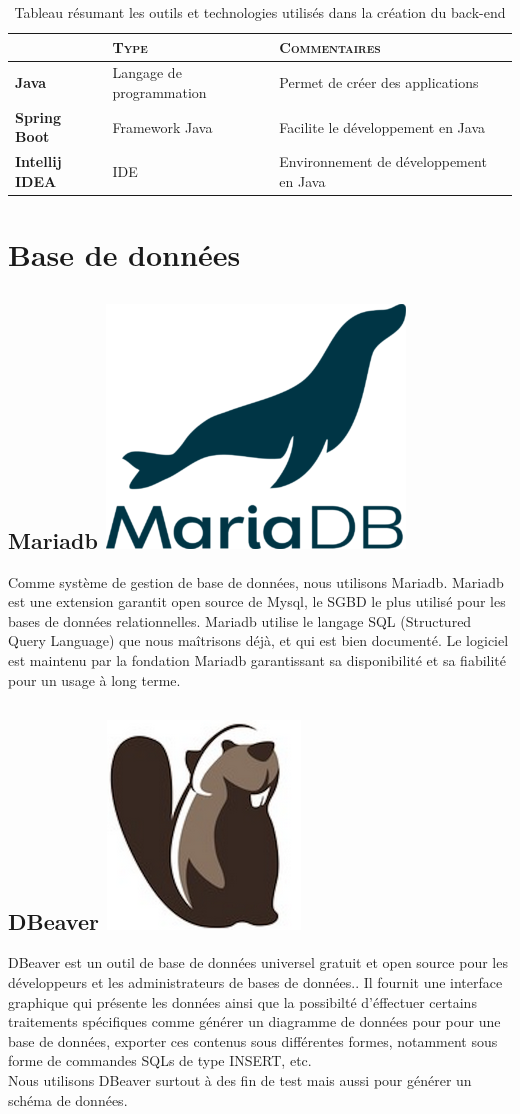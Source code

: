 \vspace{1cm}

\begin{table}[!ht]
	\centering
	\begin{tabular}[pos]{ | b | m{} | m{} |}
		\rowcolor{lightgray}
		
		& \textbf{\textsc{\large{Type}}} & \textbf{\textsc{\large{Commentaires}}}\\
		\hline
		\textbf{Java} & Langage de programmation & Permet de cr\'eer des applications\\
		\textbf{Spring Boot} & Framework Java & Facilite le d\'eveloppement en Java\\
		\textbf{Intellij IDEA} & IDE & Environnement de d\'eveloppement en Java\\
		\hline
	\end{tabular}
	\caption{Tableau r\'esumant les outils et technologies utilis\'es dans la cr\'eation du back-end}
	\label{TabOutilBackEnd}
\end{table}

			

			
	\section{Base de donn\'ees}
			
		\subsection{Mariadb \includegraphics[height=2ex]{Pictures/mariadbLogo.png}}
			Comme syst\`eme de gestion de base de donn\'ees, nous utilisons Mariadb. Mariadb est une extension garantit open source de Mysql, le SGBD le plus utilis\'e pour les bases de donn\'ees relationnelles. Mariadb utilise le langage SQL (Structured Query Language) que nous ma\^itrisons d\'ej\`a, et qui est bien document\'e. Le logiciel est maintenu par la fondation Mariadb garantissant sa disponibilit\'e et sa fiabilit\'e pour un usage \`a long terme. %

		\subsection{DBeaver \includegraphics[height=2ex]{Pictures/dbeaverLogo.png}}
			DBeaver est un outil de base de donn\'ees universel gratuit et open source pour les d\'eveloppeurs et les administrateurs de bases de donn\'ees.\cite{dbeaver}. Il fournit une interface graphique qui pr\'esente les donn\'ees ainsi que la possibilt\'e d'\'effectuer certains traitements sp\'ecifiques comme g\'en\'erer un diagramme de donn\'ees pour pour une base de donn\'ees, exporter ces contenus sous diff\'erentes formes, notamment sous forme de commandes SQLs de type INSERT, etc.\\
			Nous utilisons DBeaver surtout \`a des fin de test mais aussi pour g\'en\'erer un sch\'ema de donn\'ees.


